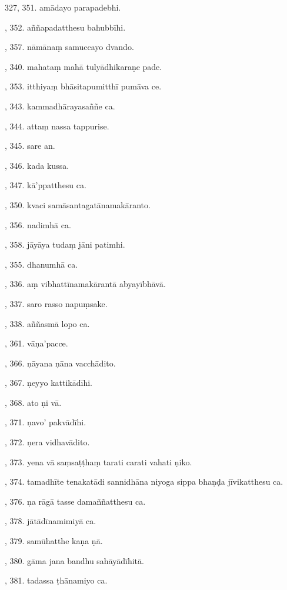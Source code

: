 327, 351. amādayo parapadebhi.\par {}, 352. aññapadatthesu bahubbīhi.\par {}, 357. nāmānaṃ samuccayo dvando.\par {}, 340. mahataṃ mahā tulyādhikaraṇe pade.\par {}, 353. itthiyaṃ bhāsitapumitthī pumāva ce.\par {}, 343. kammadhārayasaññe ca.\par {}, 344. attaṃ nassa tappurise.\par {}, 345. sare an.\par {}, 346. kada kussa.\par {}, 347. kā’ppatthesu ca.\par {}, 350. kvaci samāsantagatānamakāranto.\par {}, 356. nadimhā ca.\par {}, 358. jāyāya tudaṃ jāni patimhi.\par {}, 355. dhanumhā ca.\par {}, 336. aṃ vibhattīnamakārantā abyayībhāvā.\par {}, 337. saro rasso napuṃsake.\par {}, 338. aññasmā lopo ca.\par {}, 361. vāṇa’pacce.\par {}, 366. ṇāyana ṇāna vacchādito.\par {}, 367. ṇeyyo kattikādīhi.\par {}, 368. ato ṇi vā.\par {}, 371. ṇavo’ pakvādīhi.\par {}, 372. ṇera vidhavādito.\par {}, 373. yena vā saṃsaṭṭhaṃ tarati carati vahati ṇiko.\par {}, 374. tamadhīte tenakatādi sannidhāna niyoga sippa bhaṇḍa jīvikatthesu ca.\par {}, 376. ṇa rāgā tasse damaññatthesu ca.\par {}, 378. jātādīnamimiyā ca.\par {}, 379. samūhatthe kaṇa ṇā.\par {}, 380. gāma jana bandhu sahāyādīhitā.\par {}, 381. tadassa ṭhānamiyo ca.\par \noindent
